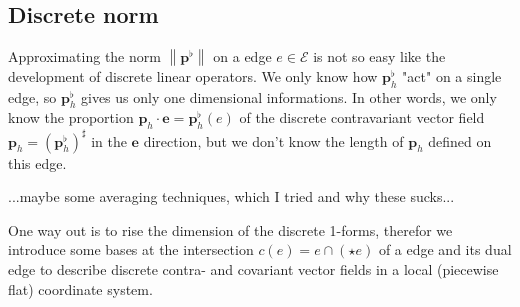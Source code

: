 \documentclass[a4paper,11pt]{scrartcl}
\newcommand{\pfl}{\mathbf{p}^{\flat}}
\newcommand{\pflh}{\mathbf{p}^{\flat}_{h}}
\newcommand{\ph}{\mathbf{p}_{h}}
\newcommand{\E}{\mathcal{E}}
\newcommand{\e}{\mathbf{e}}
\begin{document}
  \subsection{Discrete norm}
    
    Approximating the norm \( \left\| \pfl \right\| \) on a edge \( e\in\E \) is not so easy like the development of discrete linear
    operators. 
    We only know how \( \pflh \) "act" on a single edge, so \( \pflh \) gives us only one dimensional informations.
    In other words, we only know the proportion \( \ph \cdot \e = \pflh (e)\) of the discrete contravariant vector field 
    \( \ph = \left( \pflh \right)^{\sharp} \) in the
    \( \e \) direction, but we don't know the length of \( \ph \) defined on this edge.

    ...maybe some averaging techniques, which I tried and why these sucks...
   
    One way out is to rise the dimension of the discrete 1-forms, therefor we introduce some bases at the intersection 
    \( c(e) = e\cap (\star e) \) of a edge and its dual edge to describe discrete contra- and covariant vector fields in a local 
    (piecewise flat)
    coordinate system.
\end{document}
